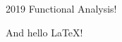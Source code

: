 \documentclass{ctexart}
\begin{document}
    2019 Functional Analysis!

    And hello \LaTeX!
\end{document}
